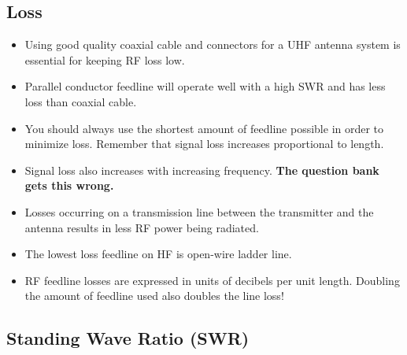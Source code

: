 \documentclass[letterpaper,12pt]{article}
\begin{document}
\subsection{Loss}

\begin{itemize}
\item Using good quality coaxial cable and connectors for a UHF antenna system is essential for keeping RF loss low.
\item Parallel conductor feedline will operate well with a high SWR and has less loss than coaxial cable.
\item You should always use the shortest amount of feedline possible in order to minimize loss. Remember that
signal loss increases proportional to length.
\item Signal loss also increases with increasing frequency. \textbf{The question bank gets this wrong.} 
\item Losses occurring on a transmission line between the transmitter and the antenna results in less RF power being radiated.
\item The lowest loss feedline on HF is open-wire ladder line.
\item RF feedline losses are expressed in units of decibels per unit length.
Doubling the amount of feedline used also doubles the line loss!
\end{itemize}

\subsection{Standing Wave Ratio (SWR)}
\end{document}
